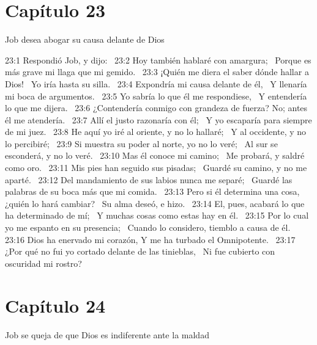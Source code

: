 \section*{Capítulo 23}
Job desea abogar su causa delante de Dios  

23:1 Respondió Job, y dijo:  
23:2 Hoy también hablaré con amargura;  
Porque es más grave mi llaga que mi gemido.  
23:3 ¡Quién me diera el saber dónde hallar a Dios!  
Yo iría hasta su silla.  
23:4 Expondría mi causa delante de él,  
Y llenaría mi boca de argumentos.  
23:5 Yo sabría lo que él me respondiese,  
Y entendería lo que me dijera.  
23:6 ¿Contendería conmigo con grandeza de fuerza? 
No; antes él me atendería.  
23:7 Allí el justo razonaría con él;  
Y yo escaparía para siempre de mi juez.  
23:8 He aquí yo iré al oriente, y no lo hallaré;  
Y al occidente, y no lo percibiré;  
23:9 Si muestra su poder al norte, yo no lo veré;  
Al sur se esconderá, y no lo veré.  
23:10 Mas él conoce mi camino;  
Me probará, y saldré como oro.  
23:11 Mis pies han seguido sus pisadas;  
Guardé su camino, y no me aparté.  
23:12 Del mandamiento de sus labios nunca me separé;  
Guardé las palabras de su boca más que mi comida.  
23:13 Pero si él determina una cosa, ¿quién lo hará cambiar?  
Su alma deseó, e hizo.  
23:14 El, pues, acabará lo que ha determinado de mí;  
Y muchas cosas como estas hay en él.  
23:15 Por lo cual yo me espanto en su presencia;  
Cuando lo considero, tiemblo a causa de él.  
23:16 Dios ha enervado mi corazón, 
Y me ha turbado el Omnipotente.  
23:17 ¿Por qué no fui yo cortado delante de las tinieblas,  
Ni fue cubierto con oscuridad mi rostro?  
\section*{Capítulo 24}
Job se queja de que Dios es indiferente ante la maldad  

